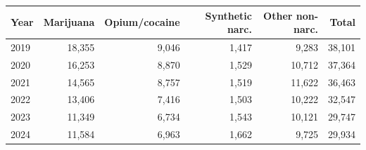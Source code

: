\begin{tabular}{l r r r r r}
\hline
Year & Marijuana & Opium/cocaine & Synthetic narc. & Other non-narc. & Total \\
\hline
2019 & 18,355 & 9,046 & 1,417 & 9,283 & 38,101 \\
2020 & 16,253 & 8,870 & 1,529 & 10,712 & 37,364 \\
2021 & 14,565 & 8,757 & 1,519 & 11,622 & 36,463 \\
2022 & 13,406 & 7,416 & 1,503 & 10,222 & 32,547 \\
2023 & 11,349 & 6,734 & 1,543 & 10,121 & 29,747 \\
2024 & 11,584 & 6,963 & 1,662 & 9,725 & 29,934 \\
\hline
\end{tabular}
